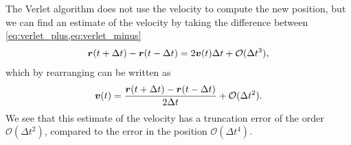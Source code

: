 The Verlet algorithm does not use the velocity to compute the new position, but we can find an estimate of the velocity by taking the difference between \cref{eq:verlet_plus,eq:verlet_minus}
\begin{align*}
    \boldsymbol{r}(t + \Delta t) - \boldsymbol{r}(t - \Delta t) = 2\boldsymbol{v}(t)\Delta t + \mathcal{O}(\Delta t^3),
\end{align*}
which by rearranging can be written as
\begin{align*}
    \boldsymbol{v}(t) = \frac{\boldsymbol{r}(t + \Delta t) - \boldsymbol{r}(t - \Delta t)}{2\Delta t} + \mathcal{O}(\Delta t^2).
\end{align*}
We see that this estimate of the velocity has a truncation error of the order $\mathcal{O}(\Delta t^2)$, compared to the error in the position $\mathcal{O}(\Delta t^4)$.

